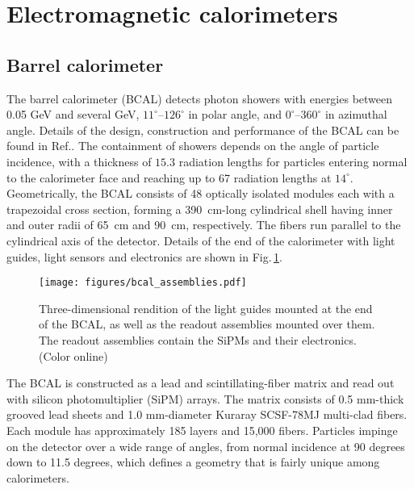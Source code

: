 \section[Electromagnetic calorimeters (Elton/Colin)] {Electromagnetic calorimeters \label{sec:calorimeters}}
\subsection[Barrel calorimeter ]{Barrel calorimeter \label{sec:bcal}}
The barrel calorimeter (BCAL) detects photon showers with energies between 0.05 GeV and several GeV, $11^{\circ}$--$126^{\circ}$ in polar angle, and $0^{\circ}$--$360^{\circ}$ in azimuthal angle. Details of the design, construction and performance of the BCAL can be found in Ref.\cite{BEATTIE201824}. The containment of showers depends on the angle of particle incidence, with a thickness of $15.3$ radiation lengths for particles entering normal to the calorimeter face and reaching up to 67 radiation lengths at $14^{\circ}$. Geometrically, the BCAL consists of 48 optically isolated modules each with a trapezoidal cross section, forming a  390~cm-long cylindrical shell having inner and outer radii of 65~cm and 90~cm, respectively. The fibers run parallel to the cylindrical axis of the detector.  Details of the end of the calorimeter with light guides, light sensors and electronics are shown in  Fig.\,\ref{fig:bcal:bcal_assemblies}.

\begin{figure}[http]\centering
\texttt{[image: figures/bcal\_assemblies.pdf]}
\caption{\label{fig:bcal:bcal_assemblies}
   Three-dimensional rendition of the light guides mounted at the end of the 
   BCAL, as well as the readout assemblies mounted over them. The 
   readout assemblies contain the 
   SiPMs and their electronics.  (Color online)
  }
\end{figure}
The BCAL is constructed as a lead and  scintillating-fiber matrix
and read out with silicon photomultiplier (SiPM) arrays. The matrix consists of 0.5 mm-thick grooved lead sheets and 1.0 mm-diameter Kuraray SCSF-78MJ multi-clad fibers.
Each module has approximately 185 layers and 15,000 fibers.
Particles impinge on the detector over a wide range of angles, from normal incidence at 90 degrees down to 11.5 degrees, which defines a geometry that is fairly unique among calorimeters. 


